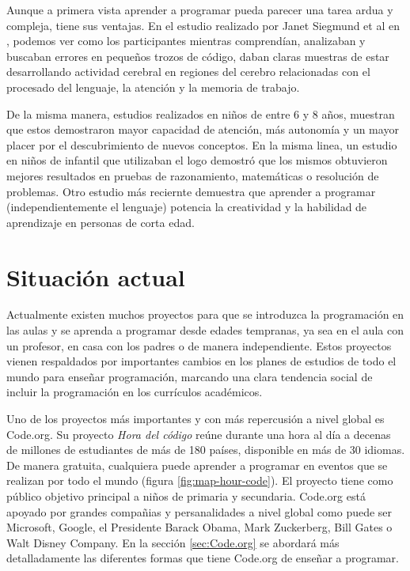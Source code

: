 Aunque a primera vista aprender a programar pueda parecer una tarea ardua y compleja, tiene sus ventajas. En el estudio realizado por Janet Siegmund {\color{red}et al} en \cite{siegmund2014understanding}, podemos ver como los participantes mientras comprendían, analizaban y buscaban errores en pequeños trozos de código, daban claras muestras de estar desarrollando actividad cerebral en regiones del cerebro relacionadas con el procesado del lenguaje, la atención y la memoria de trabajo.

De la misma manera, estudios realizados en niños \cite{clements1986effects} de entre 6 y 8 años, muestran que estos demostraron mayor capacidad de atención, más autonomía y un mayor placer por el descubrimiento de nuevos conceptos. En la misma linea, un estudio en niños de infantil \cite{logo-geometry} que utilizaban el \Gls{logo} demostró que los mismos obtuvieron mejores resultados en pruebas de razonamiento, matemáticas o resolución de problemas. Otro estudio más reciernte \cite{liao1991effects} demuestra que aprender a programar (independientemente el lenguaje) potencia la creatividad y la habilidad de aprendizaje en personas de corta edad.



\section{Situación actual}
\label{sub:aprendiendo-programar}


Actualmente existen muchos proyectos para que se introduzca la programación en las aulas y se aprenda a programar desde edades tempranas, ya sea en el aula con un profesor, en casa con los padres o de manera independiente. Estos proyectos vienen respaldados por importantes cambios en los planes de estudios de todo el mundo para enseñar programación\cite{cs-education,madrid-programacion,codigo21, guide-england-computing,chicago-cs}, marcando una clara tendencia social de incluir la programación en los currículos académicos.


Uno de los proyectos más importantes y con más repercusión a nivel global es Code.org\cite{code-org}. Su proyecto \emph{Hora del código}\cite{hour-of-code} reúne durante una hora al día a decenas de millones de estudiantes de más de 180 países, disponible en más de 30 idiomas. De manera gratuita, cualquiera puede aprender a programar en eventos que se realizan por todo el mundo (figura \ref{fig:map-hour-code}). El proyecto tiene como público objetivo principal a niños de primaria y secundaria. Code.org está apoyado por grandes compañias y persanalidades a nivel global como puede ser Microsoft, Google, el Presidente Barack Obama, Mark Zuckerberg, Bill Gates o Walt Disney Company. {\color{red}En la sección \ref{sec:Code.org} se abordará más detalladamente las diferentes formas que tiene Code.org de enseñar a programar.}


